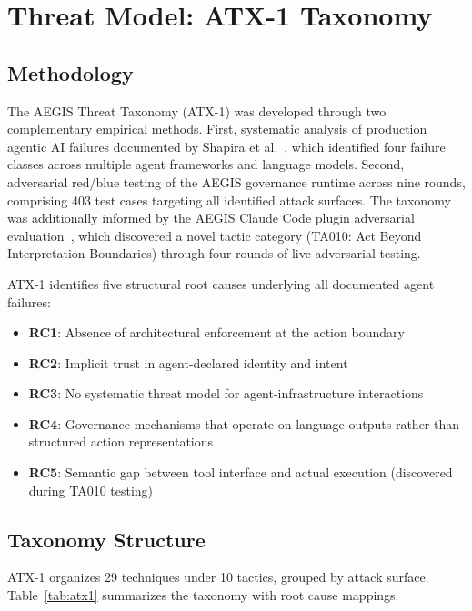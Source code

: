 \documentclass[journal]{IEEEtran}
\begin{document}
\section{Threat Model: ATX-1 Taxonomy}

\subsection{Methodology}

The AEGIS Threat Taxonomy (ATX-1) was developed through two complementary empirical methods. First, systematic analysis of production agentic AI failures documented by Shapira et al.~\cite{shapira2026}, which identified four failure classes across multiple agent frameworks and language models. Second, adversarial red/blue testing of the AEGIS governance runtime across nine rounds, comprising 403 test cases targeting all identified attack surfaces. The taxonomy was additionally informed by the AEGIS Claude Code plugin adversarial evaluation~\cite{tannenbaum2026_computer}, which discovered a novel tactic category (TA010: Act Beyond Interpretation Boundaries) through four rounds of live adversarial testing.

ATX-1 identifies five structural root causes underlying all documented agent failures:

\begin{itemize}
\item \textbf{RC1}: Absence of architectural enforcement at the action boundary
\item \textbf{RC2}: Implicit trust in agent-declared identity and intent
\item \textbf{RC3}: No systematic threat model for agent-infrastructure interactions
\item \textbf{RC4}: Governance mechanisms that operate on language outputs rather than structured action representations
\item \textbf{RC5}: Semantic gap between tool interface and actual execution (discovered during TA010 testing)
\end{itemize}

\subsection{Taxonomy Structure}

ATX-1 organizes 29 techniques under 10 tactics, grouped by attack surface. Table~\ref{tab:atx1} summarizes the taxonomy with root cause mappings.
\end{document}
